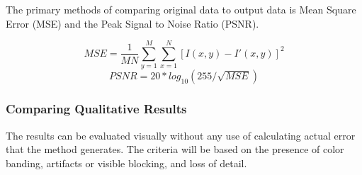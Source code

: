 \documentclass[12pt]{CPP}
\begin{document}
The primary methods of comparing original data to output data is Mean Square Error (MSE) and the Peak Signal to Noise Ratio (PSNR).

\[
MSE = \frac{1}{MN}\sum_{y=1}^{M}\sum_{x=1}^{N}[I(x,y)-I'(x,y)]^2
\]
\[
PSNR = 20*log_{10}(255/\sqrt{MSE})
\]

\subsubsection{Comparing Qualitative Results}
The results can be evaluated visually without any use of calculating actual error that the method generates. The criteria will be based on the presence of color banding, artifacts or visible blocking, and loss of detail.

\begin{figure}[!htbp]
\begin{center}

\end{center}
\end{figure}
\end{document}

